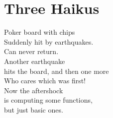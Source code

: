 \documentclass[runningheads,a4paper]{llncs}
\begin{document}
\section{Three Haikus}

Poker board with chips\\
Suddenly hit by earthquakes.\\
Can never return. \\

\noindent Another earthquake\\
hits the board, and then one more\\
Who cares which was first! \\ 

\noindent Now the aftershock\\
is computing some functions,\\
but just basic ones.
\end{document}
